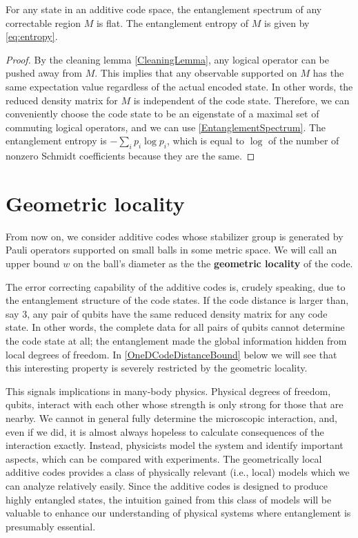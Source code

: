 \begin{cor}
For any state in an additive code space,
the entanglement spectrum of any correctable region $M$ is flat.
The entanglement entropy of $M$ is given by \eqref{eq:entropy}.
\label{EntanglementSpectrumCorrectableRegion}
\end{cor}
\begin{proof}
By the cleaning lemma \ref{CleaningLemma},
any logical operator can be pushed away from $M$.
This implies that any observable supported on $M$ has the same expectation value 
regardless of the actual encoded state.
In other words, the reduced density matrix for $M$ is independent of the code state.
Therefore, we can conveniently choose the code state to be an eigenstate of
a maximal set of commuting logical operators,
and we can use \ref{EntanglementSpectrum}.
The entanglement entropy is $- \sum_i p_i \log p_i$,
which is equal to $\log$ of the number of nonzero Schmidt coefficients
because they are the same.
\end{proof}


\section{Geometric locality}
\label{sec:GeometricLocality}

From now on, we consider additive codes whose stabilizer group is generated by
Pauli operators supported on small balls in some metric space.
We will call an upper bound $w$ on the ball's diameter 
as the the {\bf geometric locality} of the code.

The error correcting capability of the additive codes
is, crudely speaking, due to the entanglement structure of the code states.
If the code distance is larger than, say $3$,
any pair of qubits have the same reduced density matrix for any code state.
In other words, the complete data for all pairs of qubits cannot determine the code state at all;
the entanglement made the global information hidden from local degrees of freedom.
In \ref{OneDCodeDistanceBound} below we will see that this interesting property
is severely restricted by the geometric locality.

This signals implications in many-body physics.
Physical degrees of freedom, qubits, interact with each other
whose strength is only strong for those that are nearby.
We cannot in general fully determine the microscopic interaction,
and, even if we did, it is almost always hopeless to calculate
consequences of the interaction exactly.
Instead, physicists model the system and identify important aspects,
which can be compared with experiments.
The geometrically local additive codes provides a class of 
physically relevant (i.e., local) models which we can analyze relatively easily.
Since the additive codes is designed to produce highly entangled states,
the intuition gained from this class of models
will be valuable to enhance our understanding of physical systems
where entanglement is presumably essential.

